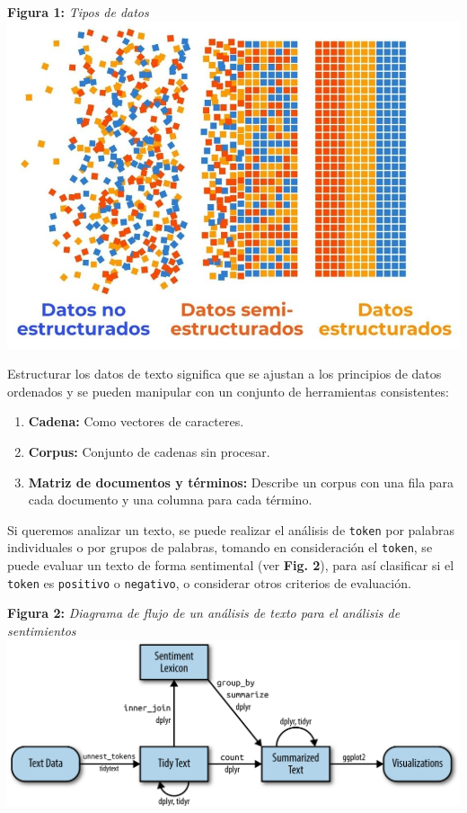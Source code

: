 \documentclass[article,30pt,extrafontsizes]{memoir}
\begin{document}
\begin{multicols*}{3}
{\begin{center}
	\textbf{Figura 1:} \emph{Tipos de datos}
	\includegraphics[width=9in]{imagenes/daaa.png}
\end{center}

Estructurar los datos de texto significa que se ajustan a los principios de datos ordenados y se pueden manipular con un conjunto de herramientas consistentes:
\begin{enumerate}
\def\labelenumi{\arabic{enumi}.}
\item
  \textbf{Cadena:} Como vectores de caracteres.
\item
  \textbf{Corpus:} Conjunto de cadenas sin procesar.
\item
  \textbf{Matriz de documentos y términos:} Describe un corpus con una fila para cada documento y una columna para cada término.
\end{enumerate}

Si queremos analizar un texto, se puede realizar el análisis de \texttt{\colorbox{tio}{\textcolor{titleboxbgcol}{token}}} por palabras individuales o por grupos de palabras, tomando en consideración el \texttt{\colorbox{tio}{\textcolor{titleboxbgcol}{token}}}, se puede evaluar un texto de forma sentimental (ver \textbf{Fig. 2}), para así clasificar si el \texttt{\colorbox{tio}{\textcolor{titleboxbgcol}{token}}} es \texttt{\colorbox{tio}{\textcolor{titleboxbgcol}{positivo}}} o \texttt{\colorbox{tio}{\textcolor{titleboxbgcol}{negativo}}}, o considerar otros criterios de evaluación.

\begin{center}
	\textbf{Figura 2:} \emph{Diagrama de flujo de un análisis de texto para el análisis de sentimientos}
	\includegraphics[width=8in]{imagenes/sent.png}
\end{center}

}
\end{multicols*}
\end{document}

